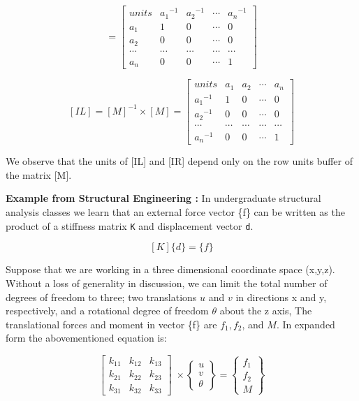 \[
= \left [ 
\begin{array}{rrrrr}
units  & {a_1}^{-1}     & {a_2}^{-1} & \cdots & {a_n}^{-1}  \\
a_1    &  1             & 0               & \cdots & 0      \\
a_2    &  0             & 0               & \cdots & 0      \\
\cdots &  \cdots        & \cdots          & \cdots & \cdots \\
a_n    &  0             & 0               & \cdots & 1
\end{array}
\right ]
\]

\[ [IL] = [M]^{-1}\times [M] = \left [
\begin{array}{rrrrr}
units       & a_1    & a_2     & \cdots & a_n    \\
{a_1}^{-1}  &  1     & 0       & \cdots & 0      \\
{a_2}^{-1}  &  0     & 0       & \cdots & 0      \\
\cdots      & \cdots & \cdots  & \cdots & \cdots \\
{a_n}^{-1}  &  0     & 0       & \cdots & 1
\end{array}
\right]
\]

\vspace{0.15 in}\noindent
We observe that the units of [IL] and [IR] depend only
on the row units buffer of the matrix [M].

\vspace{0.15 in}\noindent
{\bf Example from Structural Engineering :}
In undergraduate structural analysis classes we learn that
an external force vector \{f\} can be written as the product 
of a stiffness matrix {\tt K} and displacement vector {\tt d}.

\[ [K] \{ d\} = \{f\} \]

\vspace{0.15 in}\noindent
Suppose that we are working in a three dimensional coordinate space (x,y,z).
Without a loss of generality in discussion,
we can limit the total number of degrees of freedom to three;
two translations $u$ and $v$ in directions x and y, respectively,
and a rotational degree of freedom $\theta$ about the z axis,
The translational forces and moment in
vector \{f\} are $ f_1, f_2 $, and $ M $.
In expanded form the abovementioned equation is:

\[ \left [
\begin{array}{rrr}
 k_{11} & k_{12} & k_{13} \\
 k_{21} & k_{22} & k_{23} \\
 k_{31} & k_{32} & k_{33}
\end{array}
\right] \; \times
\left \{
\begin{array}{r}
 u  \\
 v \\
 \theta
\end{array}
\right \} = 
\left \{
\begin{array}{r}
 f_1  \\
 f_2 \\
 M
\end{array}
\right \} 
 \]

